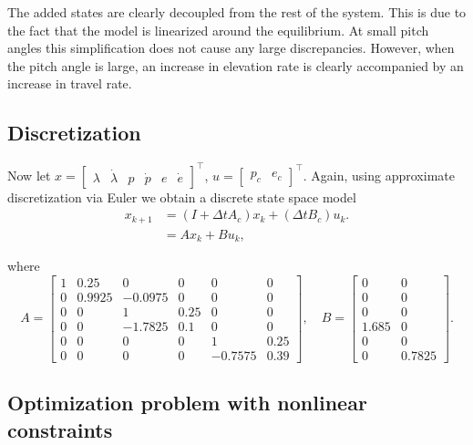 \label{text:problem4_state_space}
The added states are clearly decoupled from the rest of the system. This is due to the fact that the model is linearized around the equilibrium. At small pitch angles this simplification does not cause any large discrepancies. However, when the pitch angle is large, an increase in elevation rate is clearly accompanied by an increase in travel rate. 

\subsection{Discretization}
Now let $x = \begin{bmatrix}\lambda&\dot{\lambda}&p&\dot{p}&e&\dot{e}\end{bmatrix}^\top$, $u = \begin{bmatrix}p_c&e_c\end{bmatrix}^\top$. Again, using approximate discretization via Euler we obtain a discrete state space model
\begin{subequations}
\begin{align}
	\label{eq:ex_dsys}
	x_{k+1} &= (I + \Delta t A_c) x_k + (\Delta t B_c) u_k. \\
	&= Ax_k + Bu_k,
\end{align}
\end{subequations}

where 
\begin{equation*}
	A = 
	\begin{bmatrix}
		1 & 0.25 & 0 & 0 & 0 & 0\\
		0 & 0.9925 & -0.0975 & 0 & 0 & 0\\
		0 & 0 & 1 & 0.25 & 0 & 0\\
		0 & 0 & -1.7825 & 0.1 & 0 & 0\\
		0 & 0 & 0 & 0 & 1 & 0.25\\
		0 & 0 & 0 & 0 & -0.7575 & 0.39
	\end{bmatrix}, \quad
	B = 
	\begin{bmatrix}
		0 & 0\\
		0 & 0\\
		0 & 0\\
		1.685 & 0\\
		0 & 0\\
		0 & 0.7825
	\end{bmatrix}.
\end{equation*}

\subsection{Optimization problem with nonlinear constraints}

